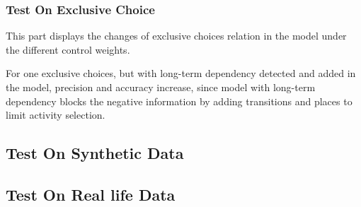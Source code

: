 \subsubsection{Test On Exclusive Choice}
This part displays the changes of exclusive choices relation in the model under the different control weights.

For one exclusive choices, 
but with long-term dependency detected and added in the model, precision and accuracy increase, since model with long-term dependency blocks the negative information by adding transitions and places to limit activity selection. 
\subsection{Test On Synthetic Data}
\subsection{Test On Real life Data}